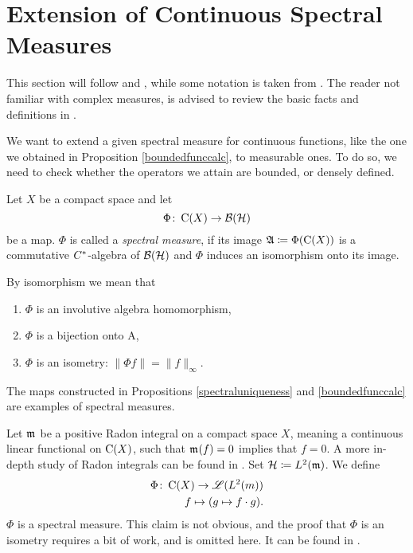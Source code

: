 
\section{Extension of Continuous Spectral Measures}\label{section4}

This section will follow \cite{LesHaupt} and \cite[pp. 341- 345]{RudinFuncAna}
, while some notation
is taken from \cite[Ch. 6]{PedAnaN}. The reader not familiar
with complex measures, is advised to review the basic facts
and definitions in 
\cite[Ch. 6]{RudinRealComp}.

We want to extend a given spectral measure for continuous functions,
like the one we obtained in Proposition \ref{boundedfunccalc}, to measurable ones. 
To do so, we need to check whether the operators we attain
are bounded, or densely defined.
\begin{defi}
 
 Let $X$ be a compact space and let
 \[
  \Phi \colon \operatorname{C} (X) \to \mathcal{B}(\mathcal{H})
 \]
be a map. $\Phi$ is called a \textit{spectral measure}, if its image 
$\mathfrak{A} \coloneqq \Phi(\operatorname{C} (X))$ is a commutative $C^{*}$-algebra of $\mathcal{B}(\mathcal{H})$ and 
$\Phi$ induces an isomorphism onto its image.
\end{defi}

\begin{rem}
 By isomorphism we mean that
 \begin{enumerate}
  \item $\Phi$ is an involutive algebra homomorphism,
  \item $\Phi$ is a bijection onto A,
  \item $\Phi$ is an isometry: $\| \Phi f \| = \| f \|_\infty$.
 \end{enumerate}

\end{rem}

\begin{expl}
 The maps constructed in Propositions \ref{spectraluniqueness}
 and \ref{boundedfunccalc} are examples
 of spectral measures.
  
Let $\mathfrak{m}_{}$ be a positive Radon integral on a compact space $X$, meaning a
continuous linear functional on $\operatorname{C} (X)$, such that $\mathfrak{m}_{}(f) = 0$ implies 
that $f=0$. A more in-depth study of Radon integrals can be found in 
\cite[Chapter~6.1]{PedAnaN}. Set $\mathcal{H} \coloneqq L^2(\mathfrak{m})$.
We define 
\begin{align*}
 \Phi \colon \operatorname{C}(X) \to \mathscr{L}({L^2({m})}) \\
 f \mapsto (g \mapsto f\cdot g).
\end{align*}
$\Phi$ is a spectral measure. This claim is not obvious, and the proof
that $\Phi$ is an isometry requires a bit of work, and is omitted here.
It can be found in \cite{LesHaupt}. 
\end{expl}

